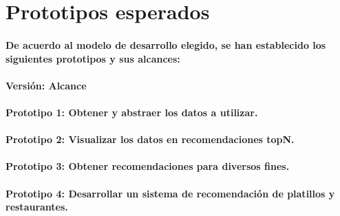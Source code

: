 
\section{Prototipos esperados}
  \paragraph{De acuerdo al modelo de desarrollo elegido, se han establecido los siguientes prototipos y sus alcances:}
  \paragraph{Versión: Alcance}
  \paragraph{Prototipo 1: Obtener y abstraer los datos a utilizar.}
  \paragraph{Prototipo 2: Visualizar los datos en recomendaciones topN.}
  \paragraph{Prototipo 3: Obtener recomendaciones para diversos fines. }
  \paragraph{Prototipo 4: Desarrollar un sistema de recomendación de platillos y restaurantes.}

